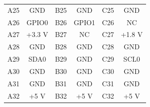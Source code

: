 \documentclass[a4paper]{article}
\begin{document}
\begin{table}[h]
\begin{center}
\begin{tabular}{cc|cc|cc}
            A25 & GND & B25 & GND & C25 & GND \\
            A26 & GPIO0 & B26 & GPIO1 & C26 & NC \\
            A27 & +3.3 V & B27 & NC & C27 & +1.8 V \\
            A28 & GND & B28 & GND & C28 & GND \\
            A29 & SDA0 & B29 & GND & C29 & SCL0 \\
            A30 & GND & B30 & GND & C30 & GND \\
            A31 & GND & B31 & GND & C31 & GND \\
            A32 & +5 V & B32 & +5 V & C32 & +5 V \\
            \hline
            \hline
        \end{tabular}
    \end{center}
\end{table}
\end{document}
